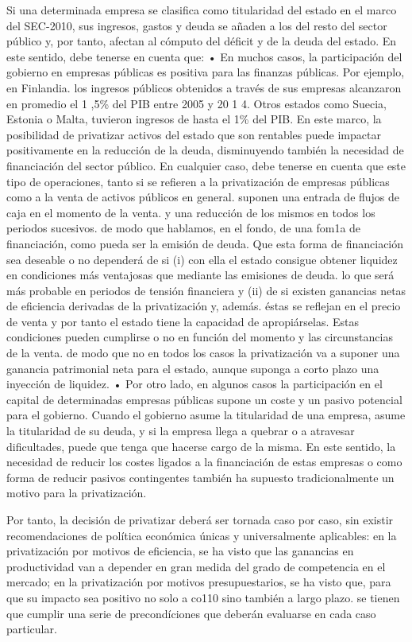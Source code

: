 \documentclass[10pt,a4paper]{article}
\begin{document}
Si una determinada empresa se clasifica como titularidad del estado en el marco del SEC-2010, sus ingresos, gastos y deuda se añaden a los del resto del sector público y, por tanto, afectan al cómputo del déficit y de la deuda del estado. En este sentido, debe tenerse en cuenta que: 
• En muchos casos, la participación del gobierno en empresas públicas es positiva para las finanzas públicas. Por ejemplo, en Finlandia. los ingresos públicos obtenidos a través de sus empresas alcanzaron en promedio el 1 ,5\% del PIB entre 2005 y 20 1 4. Otros estados como Suecia, Estonia o Malta, tuvieron ingresos de hasta el 1\% del PIB. En este marco, la posibilidad de privatizar activos del estado que son rentables puede impactar positivamente en la reducción de la deuda, disminuyendo también la necesidad de financiación del sector público. En cualquier caso, debe tenerse en cuenta que este tipo de operaciones, tanto si se refieren a la privatización de empresas públicas como a la venta de activos públicos en general. suponen una entrada de flujos de caja en el momento de la venta. y una reducción de los mismos en todos los periodos sucesivos. de modo que hablamos, en el fondo, de una fom1a de financiación, como pueda ser la emisión de deuda. Que esta forma de financiación sea deseable o no dependerá de si (i) con ella el estado consigue obtener liquidez en condiciones más ventajosas que mediante las emisiones de deuda. lo que será más probable en periodos de tensión financiera y (ii) de si existen ganancias netas de eficiencia derivadas de la privatización y, además. éstas se reflejan en el precio de venta y por tanto el estado tiene la capacidad de apropiárselas. Estas condiciones pueden cumplirse o no en función del momento y las circunstancias de la venta. de modo que no en todos los casos la privatización va a suponer una ganancia patrimonial neta para el estado, aunque suponga a corto plazo una inyección de liquidez.
• Por otro lado, en algunos casos la participación en el capital de determinadas empresas públicas supone un coste y un pasivo potencial para el gobierno. Cuando el gobierno asume la titularidad de una empresa, asume la titularidad de su deuda, y si la empresa llega a quebrar o a atravesar dificultades, puede que tenga que hacerse cargo de la misma. En este sentido, la necesidad de reducir los costes ligados a la financiación de estas empresas o como forma de reducir pasivos contingentes también ha supuesto tradicionalmente un motivo para la privatización.

Por tanto, la decisión de privatizar deberá ser tornada caso por caso, sin existir recomendaciones de política económica únicas y universalmente aplicables: en la privatización por motivos de eficiencia, se ha visto que las ganancias en productividad van a depender en gran medida del grado de competencia en el mercado; en la privatización por motivos presupuestarios, se ha visto que, para que su impacto sea positivo no solo a co110 sino también a largo plazo. se tienen que cumplir una serie de precondíciones que deberán evaluarse en cada caso particular.
\end{document}
